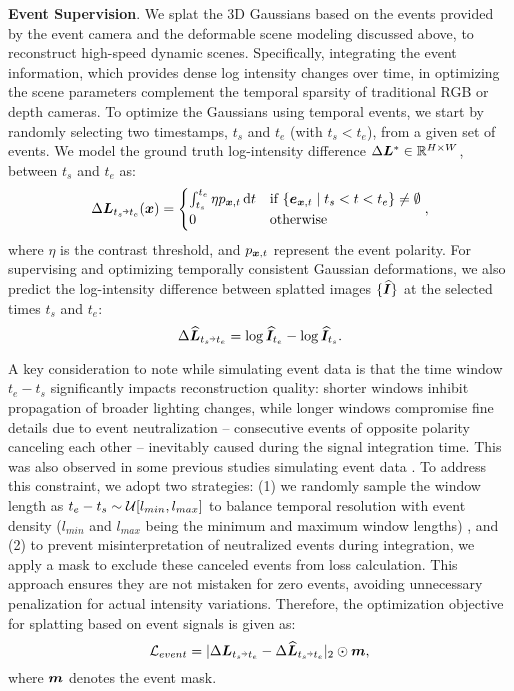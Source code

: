 \vspace{1mm}
\noindent 
\textbf{Event Supervision}. 
We splat the 3D Gaussians based on the events provided by the event camera and the deformable scene modeling discussed above, to reconstruct high-speed dynamic scenes.
Specifically, integrating the event information, which provides dense log intensity changes over time, in optimizing the scene parameters complement the temporal sparsity of traditional RGB or depth cameras.
To optimize the Gaussians using temporal events, we start by randomly selecting two timestamps, $t_s$ and $t_e$ (with $t_s<t_e$), from a given set of events. 
We model the ground truth log-intensity difference $\Delta\bm{L}^*\in\mathbb{R}^{H\times W}$, between $t_s$ and $t_e$ as:
\begin{equation}
\Delta\Lbm_{t_s\veryshortarrow t_e}(\xbm)=\begin{cases}
\int_{t_s}^{t_e} \eta p_{\xbm,t}\diff t & \text{if } \{\ebm_{\xbm,t}\mid t_s<t<t_e\}\ne \emptyset \\
0 & \text{otherwise}
\end{cases},
\end{equation}
where $\eta$ is the contrast threshold, and $p_{\bm{x},t}$ represent the event polarity.
For supervising and optimizing temporally consistent Gaussian deformations, we also predict the log-intensity difference between splatted images $\{\widehat{\bm{I}}\}$ at the selected times $t_s$ and $t_e$:
\begin{equation}
\Delta \widehat{\Lbm}_{t_s\veryshortarrow t_e} = \log{\widehat{\Ibm}_{t_e}}-\log{\widehat{\Ibm}_{t_s}}.
\end{equation}

A key consideration to note while simulating event data is that the time window $t_e-t_s$ significantly impacts reconstruction quality: shorter windows inhibit propagation of broader lighting changes, while longer windows compromise fine details due to event neutralization -- consecutive events of opposite polarity canceling each other -- inevitably caused during the signal integration time.
This was also observed in some previous studies simulating event data \cite{rudnev2023eventnerf,low2023robust,xiong2024event3dgs}.
To address this constraint, we adopt two strategies:
(1) we randomly sample the window length as $t_e-t_s\sim\mathcal{U}[l_{min},l_{max}]$ to balance temporal resolution with event density ($l_{min}$ and $l_{max}$ being the minimum and maximum window lengths) , and 
(2) to prevent misinterpretation of neutralized events during integration, we apply a mask to exclude these canceled events from loss calculation. This approach ensures they are not mistaken for zero events, avoiding unnecessary penalization for actual intensity variations.
Therefore, the optimization objective for splatting based on event signals is given as:
\begin{equation}
\Lcal_{event} = |\Delta\Lbm_{t_s\veryshortarrow t_e} - \Delta \widehat{\Lbm}_{t_s\veryshortarrow t_e}|_2\odot\mbm,
\label{eq:event-splat}
\end{equation}
where $\bm{m}$ denotes the event mask.

